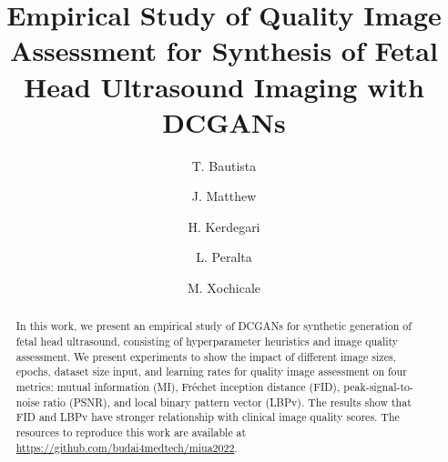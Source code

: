 \documentclass[runningheads]{llncs}
\begin{document}
\title{Empirical Study of Quality Image Assessment for Synthesis of Fetal Head Ultrasound Imaging with DCGANs}

\author{
T. Bautista \and %
J. Matthew \and %
H. Kerdegari \and %
L. Peralta \and %
M. Xochicale %
}

%
\maketitle              %

\begin{abstract}
In this work, we present an empirical study of DCGANs for synthetic generation of fetal head ultrasound, consisting of hyperparameter heuristics and image quality assessment.
We present experiments to show the impact of different image sizes, epochs, dataset size input, and learning rates for quality image assessment on four metrics: mutual information (MI), Fr\'echet inception distance (FID), peak-signal-to-noise ratio (PSNR), and local binary pattern vector (LBPv). 
The results show that FID and LBPv have stronger relationship with clinical image quality scores.
The resources to reproduce this work are available at %
\url{https://github.com/budai4medtech/miua2022}.
\end{abstract}
\end{document}
